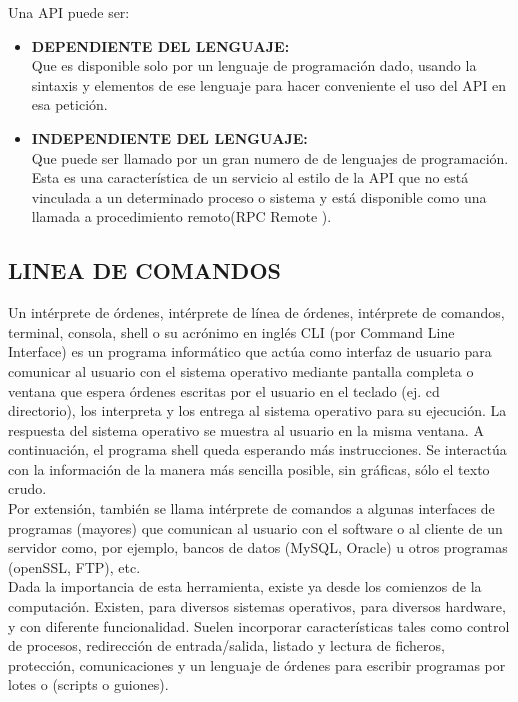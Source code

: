 Una API puede ser:

\begin{itemize}
 \item \textbf{DEPENDIENTE DEL LENGUAJE:}\\ Que es disponible solo por un lenguaje de programación dado, usando la sintaxis y elementos de ese lenguaje para hacer conveniente el uso del API en esa petición.
 \item \textbf{INDEPENDIENTE DEL LENGUAJE:}\\ Que puede ser llamado por un gran numero de de lenguajes de programación. Esta es una característica de un servicio al estilo de la API que no está vinculada a un determinado proceso o sistema y está disponible como una llamada a procedimiento remoto(RPC Remote ).
\end{itemize}

\subsection{LINEA DE COMANDOS}

Un intérprete de órdenes, intérprete de línea de órdenes, intérprete de comandos, terminal, consola, shell o su acrónimo en inglés CLI (por Command Line Interface) es un programa informático que actúa como interfaz de usuario para comunicar al usuario con el sistema operativo mediante pantalla completa o ventana que espera órdenes escritas por el usuario en el teclado (ej. cd directorio), los interpreta y los entrega al sistema operativo para su ejecución. La respuesta del sistema operativo se muestra al usuario en la misma ventana. A continuación, el programa shell queda esperando más instrucciones. Se interactúa con la información de la manera más sencilla posible, sin gráficas, sólo el texto crudo.\\

Por extensión, también se llama intérprete de comandos a algunas interfaces de programas (mayores) que comunican al usuario con el software o al cliente de un servidor como, por ejemplo, bancos de datos (MySQL, Oracle) u otros programas (openSSL, FTP), etc.\\

Dada la importancia de esta herramienta, existe ya desde los comienzos de la computación. Existen, para diversos sistemas operativos, para diversos hardware, y con diferente funcionalidad. Suelen incorporar características tales como control de procesos, redirección de entrada/salida, listado y lectura de ficheros, protección, comunicaciones y un lenguaje de órdenes para escribir programas por lotes o (scripts o guiones).\\

